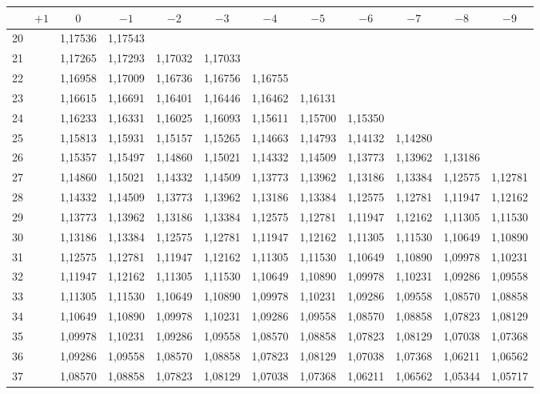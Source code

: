 \documentclass[12pt,a4paper]{article}
\begin{document}
\begin{center}
\footnotesize
\begin{tabular}{|c|c|c|c|c|c|c|c|c|c|c|c|}
\hline
 & $+1$ & $0$ & $-1$ & $-2$ & $-3$ & $-4$ & $-5$ & $-6$ & $-7$ & $-8$ & $-9$ \\
\hline
20 & & 1,17536 & 1,17543 & & & & & & & & \\
21 & & 1,17265 & 1,17293 & 1,17032 & 1,17033 & & & & & & \\
22 & & 1,16958 & 1,17009 & 1,16736 & 1,16756 & 1,16755 & & & & & \\
23 & & 1,16615 & 1,16691 & 1,16401 & 1,16446 & 1,16462 & 1,16131 & & & & \\
24 & & 1,16233 & 1,16331 & 1,16025 & 1,16093 & 1,15611 & 1,15700 & 1,15350 & & & \\
25 & & 1,15813 & 1,15931 & 1,15157 & 1,15265 & 1,14663 & 1,14793 & 1,14132 & 1,14280 & & \\
26 & & 1,15357 & 1,15497 & 1,14860 & 1,15021 & 1,14332 & 1,14509 & 1,13773 & 1,13962 & 1,13186 & \\
27 & & 1,14860 & 1,15021 & 1,14332 & 1,14509 & 1,13773 & 1,13962 & 1,13186 & 1,13384 & 1,12575 & 1,12781 \\
28 & & 1,14332 & 1,14509 & 1,13773 & 1,13962 & 1,13186 & 1,13384 & 1,12575 & 1,12781 & 1,11947 & 1,12162 \\
29 & & 1,13773 & 1,13962 & 1,13186 & 1,13384 & 1,12575 & 1,12781 & 1,11947 & 1,12162 & 1,11305 & 1,11530 \\
30 & & 1,13186 & 1,13384 & 1,12575 & 1,12781 & 1,11947 & 1,12162 & 1,11305 & 1,11530 & 1,10649 & 1,10890 \\
31 & & 1,12575 & 1,12781 & 1,11947 & 1,12162 & 1,11305 & 1,11530 & 1,10649 & 1,10890 & 1,09978 & 1,10231 \\
32 & & 1,11947 & 1,12162 & 1,11305 & 1,11530 & 1,10649 & 1,10890 & 1,09978 & 1,10231 & 1,09286 & 1,09558 \\
33 & & 1,11305 & 1,11530 & 1,10649 & 1,10890 & 1,09978 & 1,10231 & 1,09286 & 1,09558 & 1,08570 & 1,08858 \\
34 & & 1,10649 & 1,10890 & 1,09978 & 1,10231 & 1,09286 & 1,09558 & 1,08570 & 1,08858 & 1,07823 & 1,08129 \\
35 & & 1,09978 & 1,10231 & 1,09286 & 1,09558 & 1,08570 & 1,08858 & 1,07823 & 1,08129 & 1,07038 & 1,07368 \\
36 & & 1,09286 & 1,09558 & 1,08570 & 1,08858 & 1,07823 & 1,08129 & 1,07038 & 1,07368 & 1,06211 & 1,06562 \\
37 & & 1,08570 & 1,08858 & 1,07823 & 1,08129 & 1,07038 & 1,07368 & 1,06211 & 1,06562 & 1,05344 & 1,05717 \\
\hline
\end{tabular}
\end{center}
\end{document}
